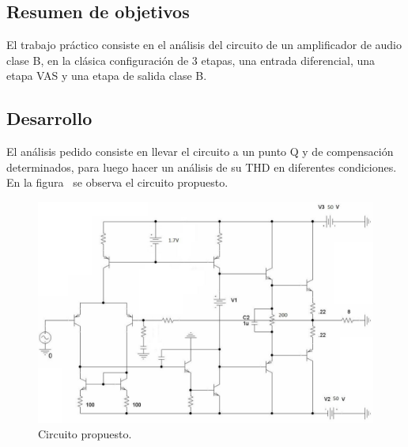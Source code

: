 
\subsection{Resumen de objetivos}


\normalfont

El trabajo práctico consiste en el análisis del circuito de un amplificador de audio clase B, en la clásica configuración de 3 etapas, una entrada diferencial, una etapa VAS y una etapa de salida clase B.


\subsection{Desarrollo}

El análisis pedido consiste en llevar el circuito a un punto Q y de compensación determinados, para luego hacer un análisis de su THD en diferentes condiciones. En la figura~ se observa el circuito propuesto.


\begin{figure}[H] %
\begin{center}
\includegraphics[width=1.0 \textwidth, angle=0]{./img/enunciado/circuito_enunciado.png}
\caption{\label{fig:fig_original_circuit}\footnotesize{Circuito propuesto.}}
\end{center}
\end{figure}


\clearpage

